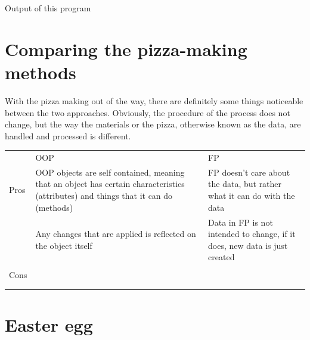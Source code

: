 \documentclass[a4paper]{article}
\numberwithin{equation}{section}
\begin{document}
Output of this program

\newpage
\section{Comparing the pizza-making methods}
With the pizza making out of the way, there are definitely some things noticeable between the two approaches.
Obviously, the procedure of the process does not change, but the way the materials or the pizza, otherwise known as the data, are handled and processed is different.

\begin{center}
  \begin{tabularx}{\textwidth}{l*{2}{X}}
    \toprule
         & OOP                                                                                                                                 & FP                                                                         \\
    \cmidrule(lr){2-3}
    Pros & OOP objects are self contained, meaning that an object has certain characteristics (attributes) and things that it can do (methods) & FP doesn't care about the data, but rather what it can do with the data    \\
         & Any changes that are applied is reflected on the object itself                                                                      & Data in FP is not intended to change, if it does, new data is just created \\
         &                                                                                                                                     &                                                                            \\
    \midrule
    Cons &                                                                                                                                     &                                                                            \\
         &                                                                                                                                     &                                                                            \\
         &                                                                                                                                     &                                                                            \\
    \bottomrule
  \end{tabularx}
\end{center}

\newpage
\section*{Easter egg}
\end{document}
